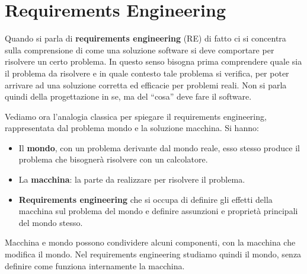 \chapter{Requirements Engineering}
Quando si parla di \textbf{requirements engineering} (RE) di fatto ci si concentra
sulla comprensione di come una soluzione software si deve comportare per risolvere
un certo problema. In questo senso bisogna prima comprendere quale sia il problema
da risolvere e in quale contesto tale problema si verifica, per poter arrivare
ad una soluzione corretta ed efficacie per problemi reali. Non si parla quindi
della progettazione in se, ma del “cosa” deve fare il software.

Vediamo ora l'analogia classica per spiegare il requirements engineering,
rappresentata dal problema mondo e la soluzione macchina. Si hanno:
\begin{itemize}
      \item Il \textbf{mondo}, con un problema derivante dal mondo reale, esso
            stesso produce il problema che bisognerà risolvere con un calcolatore.
      \item La \textbf{macchina}: la parte da realizzare per risolvere il problema.
      \item \textbf{Requirements engineering} che si occupa di definire gli effetti
            della macchina sul problema del mondo e definire assunzioni e proprietà
            principali del mondo stesso.
\end{itemize}
Macchina e mondo possono condividere alcuni componenti, con la macchina che
modifica il mondo. Nel requirements engineering studiamo quindi il mondo, senza
definire come funziona internamente la macchina.

